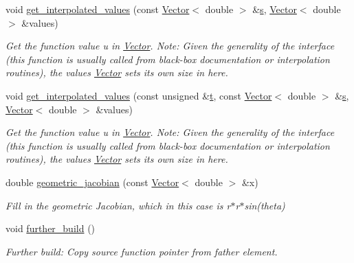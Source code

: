\begin{DoxyCompactItemize}
void \hyperlink{classoomph_1_1RefineableSphericalAdvectionDiffusionEquations_ae8ee03bbf706d765a3756a3a2f8804f9}{get\+\_\+interpolated\+\_\+values} (const \hyperlink{classoomph_1_1Vector}{Vector}$<$ double $>$ \&\hyperlink{cfortran_8h_ab7123126e4885ef647dd9c6e3807a21c}{s}, \hyperlink{classoomph_1_1Vector}{Vector}$<$ double $>$ \&values)
\begin{DoxyCompactList}\small\item\em Get the function value u in \hyperlink{classoomph_1_1Vector}{Vector}. Note\+: Given the generality of the interface (this function is usually called from black-\/box documentation or interpolation routines), the values \hyperlink{classoomph_1_1Vector}{Vector} sets its own size in here. \end{DoxyCompactList}\item 
void \hyperlink{classoomph_1_1RefineableSphericalAdvectionDiffusionEquations_a208a004e8b7403001400d7de2ebd692f}{get\+\_\+interpolated\+\_\+values} (const unsigned \&\hyperlink{cfortran_8h_af6f0bd3dc13317f895c91323c25c2b8f}{t}, const \hyperlink{classoomph_1_1Vector}{Vector}$<$ double $>$ \&\hyperlink{cfortran_8h_ab7123126e4885ef647dd9c6e3807a21c}{s}, \hyperlink{classoomph_1_1Vector}{Vector}$<$ double $>$ \&values)
\begin{DoxyCompactList}\small\item\em Get the function value u in \hyperlink{classoomph_1_1Vector}{Vector}. Note\+: Given the generality of the interface (this function is usually called from black-\/box documentation or interpolation routines), the values \hyperlink{classoomph_1_1Vector}{Vector} sets its own size in here. \end{DoxyCompactList}\item 
double \hyperlink{classoomph_1_1RefineableSphericalAdvectionDiffusionEquations_addfcf580759ab8cf263c8e00acd31953}{geometric\+\_\+jacobian} (const \hyperlink{classoomph_1_1Vector}{Vector}$<$ double $>$ \&x)
\begin{DoxyCompactList}\small\item\em Fill in the geometric Jacobian, which in this case is r$\ast$r$\ast$sin(theta) \end{DoxyCompactList}\item 
void \hyperlink{classoomph_1_1RefineableSphericalAdvectionDiffusionEquations_a77053e6352f6cc7a3c550d7bc4ee8b39}{further\+\_\+build} ()
\begin{DoxyCompactList}\small\item\em Further build\+: Copy source function pointer from father element. \end{DoxyCompactList}\item 

\end{DoxyCompactItemize}
